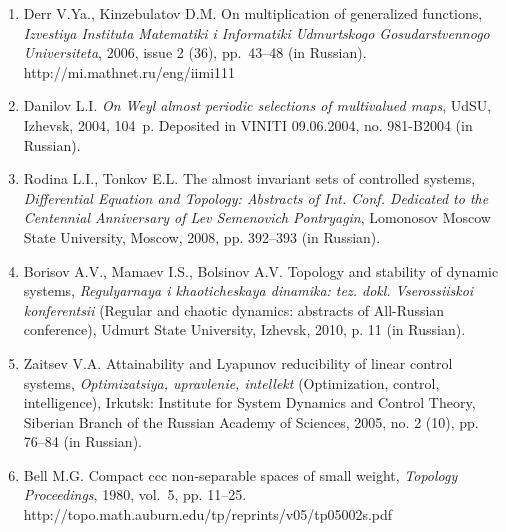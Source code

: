 \documentclass[12pt,a4paper,twoside]{article}  %
\begin{document}
\begin{enumerate}

\item
Derr V.Ya., Kinzebulatov D.M. On multiplication of generalized functions, {\it Izvestiya Instituta Matematiki i Informatiki Udmurtskogo Gosudarstvennogo Universiteta},
2006, issue 2 (36), pp.~43--48 (in Russian).
http://mi.mathnet.ru/eng/iimi111


\item
Danilov L.I. {\it On Weyl almost periodic selections of multivalued maps}, UdSU, Izhevsk, 2004, 104~p. Deposited in VINITI 09.06.2004, no. 981-B2004 (in Russian).


\item
Rodina L.I., Tonkov E.L. The almost invariant sets of controlled systems, {\it Differential Equation and Topology: Abstracts of Int. Conf. Dedicated to the Centennial Anniversary of Lev Semenovich Pontryagin}, Lomonosov Moscow State University, Moscow, 2008, pp. 392--393 (in Russian).

\item
Borisov A.V., Mamaev I.S., Bolsinov A.V. Topology and stability of dynamic systems, {\it Regulyarnaya i khaoticheskaya dinamika: tez. dokl. Vserossiiskoi konferentsii} (Regular and chaotic dynamics: abstracts of All-Russian conference), Udmurt State University, Izhevsk, 2010, p. 11 (in Russian).


\item
Zaitsev V.A. Attainability and Lyapunov reducibility of linear control systems, {\it Optimizatsiya, upravlenie, intellekt} (Optimization, control, intelligence), Irkutsk: Institute for System Dynamics and Control Theory, Siberian Branch of the Russian Academy of Sciences, 2005, no. 2 (10), pp. 76--84 (in Russian).


\item
Bell M.G. Compact ccc non-separable spaces of small weight, {\it Topology Proceedings}, 1980, vol.~5, pp. 11--25.
http://topo.math.auburn.edu/tp/reprints/v05/tp05002s.pdf



\end{enumerate}
\end{document}
